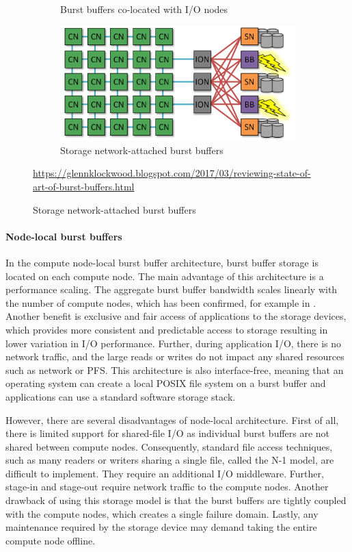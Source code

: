 \documentclass[thesis-en.tex]{subfiles}
\begin{document}
\begin{figure}[htb]
\begin{subfigure}[b]{0.5\linewidth}
    \caption{Burst buffers co-located with I/O nodes} 
    \label{fig:architecture-on-ion} 
  \end{subfigure}
  \hfill
  \begin{subfigure}[b]{0.5\linewidth}
    \centering
    \includegraphics[width=0.8\linewidth]{images/architecture-backend.png} 
    \caption{Storage network-attached burst buffers} 
    \label{fig:architecture-backend} 
  \end{subfigure} 
  {\url{https://glennklockwood.blogspot.com/2017/03/reviewing-state-of-art-of-burst-buffers.html}}
  \label{fig:burst-buffer-architectures} 
\end{figure}

\paragraph{Node-local burst buffers}
In the compute node-local burst buffer architecture, burst buffer storage is located on each compute node. The main advantage of this architecture is a performance scaling. The aggregate burst buffer bandwidth scales linearly with the number of compute nodes, which has been confirmed, for example in \cite{Wang2016BurstFSAD,5645453}. Another benefit is exclusive and fair access of applications to the storage devices, which provides more consistent and predictable access to storage resulting in lower variation in I/O performance. Further, during application I/O, there is no network traffic, and the large reads or writes do not impact any shared resources such as network or PFS. This architecture is also interface-free, meaning that an operating system can create a local POSIX file system on a burst buffer and applications can use a standard software storage stack.

However, there are several disadvantages of node-local architecture. First of all, there is limited support for shared-file I/O as individual burst buffers are not shared between compute nodes. Consequently, standard file access techniques, such as many readers or writers sharing a single file, called the N-1 model, are difficult to implement. They require an additional I/O middleware. Further, stage-in and stage-out require network traffic to the compute nodes. Another drawback of using this storage model is that the burst buffers are tightly coupled with the compute nodes, which creates a single failure domain. Lastly, any maintenance required by the storage device may demand taking the entire compute node offline.
\end{document}
